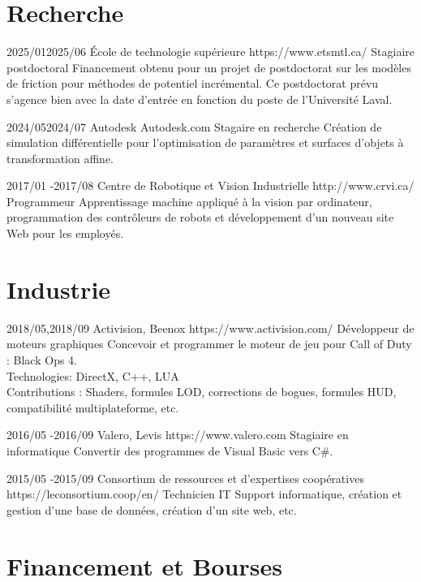 \documentclass[10pt]{article} %
\begin{document}
\section{Recherche}
\job
{2025/01}{2025/06}
{École de technologie supérieure}
{https://www.etsmtl.ca/}
{Stagiaire postdoctoral}
{Financement obtenu pour un projet de postdoctorat sur les modèles de friction pour méthodes de potentiel incrémental. Ce postdoctorat prévu s'agence bien avec la date d'entrée en fonction du poste de l'Université Laval.}

\job
{2024/05}{2024/07}
{Autodesk}
{Autodesk.com}
{Stagaire en recherche}
{Création de simulation différentielle pour l'optimisation de paramètres et surfaces d'objets à transformation affine.}

\job
{2017/01 -}{2017/08}
{Centre de Robotique et Vision Industrielle}
{http://www.crvi.ca/}
{Programmeur}
{Apprentissage machine appliqué à la vision par ordinateur, programmation des contrôleurs de robots et développement d'un nouveau
site Web pour les employés.}

\section{Industrie}
\job
{2018/05,}{2018/09}
{Activision, Beenox}
{https://www.activision.com/}
{Développeur de moteurs graphiques}
{Concevoir et programmer le moteur de jeu pour Call of Duty : Black Ops 4.\\
 Technologies: DirectX, C++, LUA \\
 Contributions : Shaders, formules LOD, corrections de bogues, formules HUD, compatibilité multiplateforme, etc.}

\job
{2016/05 -}{2016/09}
{Valero, Levis}
{https://www.valero.com}
{Stagiaire en informatique}
{Convertir des programmes de Visual Basic vers C\#.}

\job
{2015/05 -}{2015/09}
{Consortium de ressources et d'expertises coopératives}
{https://leconsortium.coop/en/}
{Technicien IT}
{Support informatique, création et gestion d'une base de données, création d'un site web, etc.}


\section{Financement et Bourses}
\end{document}
